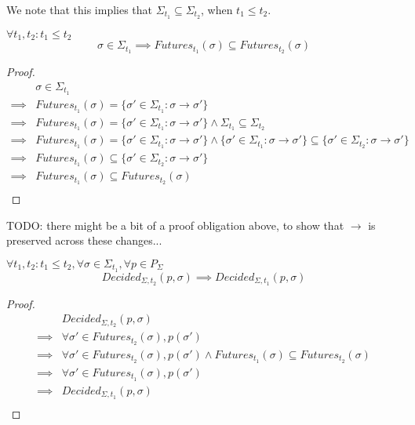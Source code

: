 We note that this implies that $\Sigma_{t_1} \subseteq \Sigma_{t_2}$, when $t_1 \leq t_2$.

\begin{lemma}
$\forall t_1, t_2 : t_1 \leq t_2$
$$
\sigma \in \Sigma_{t_1} \implies Futures_{t_1}(\sigma) \subseteq Futures_{t_2}(\sigma)
$$
\end{lemma}

\begin{proof}
\begin{align}
        &\sigma \in \Sigma_{t_1} \\
\implies&Futures_{t_1}(\sigma) = \{\sigma' \in \Sigma_{t_1} : \sigma \to \sigma'\} \\
\implies&Futures_{t_1}(\sigma) = \{\sigma' \in \Sigma_{t_1} : \sigma \to \sigma'\} \land \Sigma_{t_1} \subseteq \Sigma_{t_2} \\
\implies&Futures_{t_1}(\sigma) = \{\sigma' \in \Sigma_{t_1} : \sigma \to \sigma'\} \land \{\sigma' \in \Sigma_{t_1} : \sigma \to \sigma'\} \subseteq \{\sigma' \in \Sigma_{t_2} : \sigma \to \sigma'\} \\
\implies&Futures_{t_1}(\sigma) \subseteq \{\sigma' \in \Sigma_{t_2} : \sigma \to \sigma'\} \\
\implies&Futures_{t_1}(\sigma) \subseteq Futures_{t_2}(\sigma) \\
\end{align}
\end{proof}

TODO: there might be a bit of a proof obligation above, to show that $\to$ is preserved across these changes...


\begin{lemma}
\label{lem:backw_safe}
$\forall t_1, t_2 : t_1 \leq t_2, \forall \sigma \in \Sigma_{t_1}, \forall p \in P_\Sigma$
$$
Decided_{\Sigma, t_2}(p,\sigma) \implies Decided_{\Sigma, t_1}(p,\sigma)
$$
\end{lemma}

\begin{proof}
\begin{align}
        &Decided_{\Sigma, t_2}(p,\sigma) \\
\implies&\forall \sigma' \in Futures_{t_2}(\sigma), p(\sigma') \\
\implies&\forall \sigma' \in Futures_{t_2}(\sigma), p(\sigma') \land Futures_{t_1}(\sigma) \subseteq Futures_{t_2}(\sigma) \\
\implies&\forall \sigma' \in Futures_{t_1}(\sigma), p(\sigma') \\
\implies&Decided_{\Sigma, t_1}(p,\sigma) \\
\end{align}
\end{proof}


